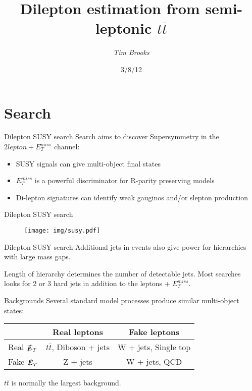 \documentclass{beamer}
\title[Dilepton SUSY search\hspace{2em}\insertframenumber/
\inserttotalframenumber]{Dilepton estimation from semi-leptonic $t \bar{t}$}
\author{\emph{Tim Brooks}}
\institute{Royal Holloway University of London}
\date{3/8/12}
\begin{document}

\section{Search}
\begin{frame}{Dilepton SUSY search}
Search aims to discover Supersymmetry in the $2 lepton + E_{T}^{miss}$ channel:
  \begin{itemize}
    \item SUSY signals can give multi-object final states
    \item $E_{T}^{miss}$ is a powerful discriminator for R-parity preserving models
    \item Di-lepton signatures can identify weak gauginos and/or slepton production
  \end{itemize}
\end{frame}

\begin{frame}{Dilepton SUSY search}
  \begin{figure}
    \centering
    \texttt{[image: img/susy.pdf]}
  \end{figure}
\end{frame}

\begin{frame}{Dilepton SUSY search}
Additional jets in events also give power for hierarchies with large mass gaps.

Length of hierarchy determines the number of detectable jets. Most searches looks for 2 or 3 hard jets in addition to the leptons + $E_{T}^{miss}$.
\end{frame}

\begin{frame}{Backgrounds}
Several standard model processes produce similar multi-object states:

\begin{table}
\centering
\begin{tabular}{l||c|c}
                     & Real leptons               & Fake leptons         \\
\hline \hline
Real $\slashed{E}_{T}$ & $t\bar{t}$, Diboson + jets & W + jets, Single top \\
\hline
Fake $\slashed{E}_{T}$ & Z + jets                   & W + jets, QCD        \\
\end{tabular}
\label{tab:myfirsttable}
\end{table}

$t\bar{t}$ is normally the largest background.
\end{frame}
\end{document}
